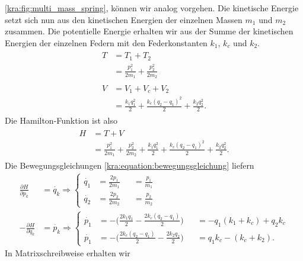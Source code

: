 \ref{kra:fig:multi_mass_spring}, können wir analog vorgehen.
Die kinetische Energie setzt sich nun aus den kinetischen Energien
der einzelnen Massen $m_1$ und $m_2$ zusammen.
Die potentielle Energie erhalten wir aus der Summe der kinetischen
Energien der einzelnen Federn mit den Federkonstanten $k_1$, $k_c$
und $k_2$.
\begin{align*}
    \begin{split}
        T   &= T_1 + T_2 \\
        &= \frac{p_1^2}{2m_1} + \frac{p_2^2}{2m_2}
    \end{split}
    \\
    \begin{split}
        V   &= V_1 + V_c + V_2 \\
        &= \frac{k_1 q_1^2}{2} + \frac{k_c (q_2 - q_1)^2}{2} + \frac{k_2 q_2^2}{2}.
    \end{split}
\end{align*}
Die Hamilton-Funktion ist also
\begin{align*}
    \begin{split}
        H   &= T + V \\
        &= \frac{p_1^2}{2m_1} + \frac{p_2^2}{2m_2} + \frac{k_1 q_1^2}{2} + \frac{k_c (q_2 - q_1)^2}{2} + \frac{k_2 q_2^2}{2}.
    \end{split}
\end{align*}
Die Bewegungsgleichungen \eqref{kra:equation:bewegungsgleichung} liefern
\begin{align*}
    \frac{\partial H}{\partial p_k}  & = \dot{q_k}
    \Rightarrow
    \left\{
    \begin{alignedat}{2}
        \dot{q_1}   &= \frac{2p_1}{2m_1}    &&= \frac{p_1}{m_1}\\
        \dot{q_2}   &= \frac{2p_2}{2m_2}    &&= \frac{p_2}{m_2}
    \end{alignedat}
    \right.
    \\
    -\frac{\partial H}{\partial q_k} & = \dot{p_k}
    \Rightarrow
    \left\{
    \begin{alignedat}{2}
        \dot{p_1}   &= -\biggl(\frac{2k_1q_1}{2} - \frac{2k_c(q_2-q_1)}{2}\biggr)  &&= -q_1(k_1+k_c) + q_2k_c \\
        \dot{p_1}   &= -\biggl(\frac{2k_c(q_2-q_1)}{2} - \frac{2k_2q_2}{2}\biggr)  &&= q_1k_c - (k_c + k_2).
    \end{alignedat}
    \right.
\end{align*}
In Matrixschreibweise erhalten wir
